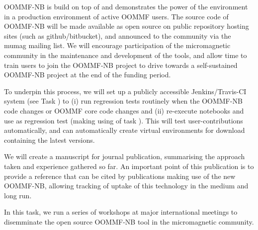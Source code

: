 \begin{workpackage}[id=dissem,wphases=18-48!.5,
  title=Dissemination,
  SARM=1,
  USORM=7,
<<<<<<< HEAD
  USHRM=8
=======
  USHRM=8,
  USRM=24
>>>>>>> e490abbfa8a91427570f1a7695a6a95cd4610713
]
\begin{task}[id=dissemination-of-oommf-nb-virtual-environment,
  title=Dissemination of OOMMF-NB virtual environment]
  OOMMF-NB is build on top of \TheProject and demonstrates the power
  of the environment in a production environment of active OOMMF users. 
  The source code of OOMMF-NB will be made available as open source on
  public repository hosting sites (such as github/bitbucket), and
  announced to the community via the mumag mailing list. We will
  encourage participation of the micromagnetic community in the
  maintenance and development of the tools, and allow time to train
  users to join the OOMMF-NB project to drive towards a self-sustained
  OOMMF-NB project at the end of the funding period.

  To underpin this process, we will set up a publicly accessible Jenkins/Travis-CI system
  (see Task ) to (i) run regression tests routinely when the
  OOMMF-NB code changes or OOMMF core code changes and (ii) re-execute notebooks and use
  as regression test (making using of task ). This will
  test user-contributions automatically, and can automatically create virtual environments
  for download containing the latest versions.

  We will create a manuscript for journal publication, summarising the
  approach taken and experience gathered so far. An important point of
  this publication is to provide a reference that can be cited by
  publications making use of the new OOMMF-NB, allowing tracking of
  uptake of this technology in the medium and long run.
\end{task}

\begin{task}[title=OOMMF-NB dissemination workshops,
id=dissemination-of-oommf-nb-workshops]
  
  In this task, we run a series of workshops at major international
  meetings to disemminate the open source OOMMF-NB tool in the
  micromagnetic community.


\end{task}
\end{workpackage}
